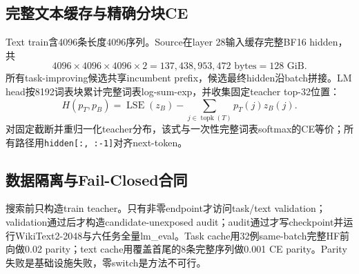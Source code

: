 \subsection{完整文本缓存与精确分块CE}

Text train含4096条长度4096序列。Source在layer 28输入缓存完整BF16 hidden，共
\begin{equation}
4096\times4096\times4096\times2=137{,}438{,}953{,}472\text{ bytes}=128\text{ GiB}.
\end{equation}
所有task-improving候选共享incumbent prefix，候选最终hidden沿batch拼接。LM head按8192词表块累计完整词表log-sum-exp，并收集固定teacher top-32位置：
\begin{equation}
H(p_T,p_B)=\operatorname{LSE}(z_B)-\sum_{j\in\operatorname{topk}(T)}p_T(j)z_B(j).
\end{equation}
对固定截断并重归一化teacher分布，该式与一次性完整词表softmax的CE等价；所有路径用\texttt{hidden[:, :-1]}对齐next-token。

\subsection{数据隔离与Fail-Closed合同}

搜索前只构造train teacher。只有非零endpoint才访问task/text validation；validation通过后才构造candidate-unexposed audit；audit通过才写checkpoint并运行WikiText2-2048与六任务全量lm\_eval。Task cache用32例same-batch完整HF前向做0.02 parity；text cache用覆盖首尾的8条完整序列做0.001 CE parity。Parity失败是基础设施失败，零switch是方法不可行。

